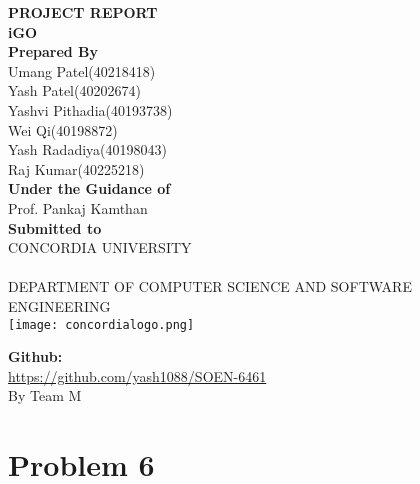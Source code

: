 \documentclass[a4paper,12pt]{report}
\begin{document}
\begin{titlepage}
   \begin{center}
       \vspace*{-8ex}
        \begin{figure}[h!]
  \centering
\end{figure}

       \textbf{\large PROJECT REPORT }\\[0.3in]
        \textbf{\large iGO} \\ [0.3in]
        \textbf{\large Prepared By} \\[0.5in]
        \normal Umang Patel(40218418)\\[0.1in]
        \normal Yash Patel(40202674)\\[0.1in]
        \normal Yashvi Pithadia(40193738)\\[0.1in]
        \normal Wei Qi(40198872)\\[0.1in]
        \normal Yash Radadiya(40198043)\\[0.1in]
        \normal Raj Kumar(40225218)\\[0.5in]

        \textbf{\large Under the Guidance of}\\[0.15in]
        \normal Prof. Pankaj Kamthan\\[0.4in]

        \textbf{\large Submitted to}\\[0.15in]
        \normal CONCORDIA UNIVERSITY\\\\[0.05in]
        \normal DEPARTMENT OF COMPUTER SCIENCE AND SOFTWARE ENGINEERING\\[0.2in]
        \texttt{[image: concordialogo.png]}

       \vspace{1.0cm}
      
        \textbf{Github:}\\\url{https://github.com/yash1088/SOEN-6461}\\[0.2in]
         \normal By
        \normal Team M
       \vfill
   \end{center}
\end{titlepage}

\tableofcontents

\chapter{Problem 6}
\end{document}
